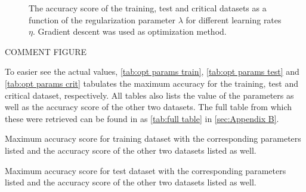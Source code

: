 \begin{figure}[H]
\qquad
{}
\caption{The accuracy score of the training, test and critical datasets as a function of the regularization parameter $\lambda$ for different learning rates $\eta$. Gradient descent was used as optimization method.}
\label{fig:gd_acc_lambda}
\end{figure}

COMMENT FIGURE

To easier see the actual values, \autoref{tab:opt params train}, \autoref{tab:opt params test} and \autoref{tab:opt params crit} tabulates the maximum accuracy for the training, test and critical dataset, respectively. All tables also lists the value of the parameters as well as the accuracy score of the other two datasets. The full table from which these were retrieved can be found in as \autoref{tab:full table} in \autoref{sec:Appendix B}.

\begin{table}[H]
\parbox{.45\linewidth}{
\caption{Maximum accuracy score for training dataset with the corresponding parameters listed and the accuracy score of the other two datasets listed as well.}
\centering
{}

\label{tab:opt params train}
}
\hfill
\parbox{.45\linewidth}{
\caption{Maximum accuracy score for test dataset with the corresponding parameters listed and the accuracy score of the other two datasets listed as well.}
\centering
{}

\label{tab:opt params test}
}
\end{table}


